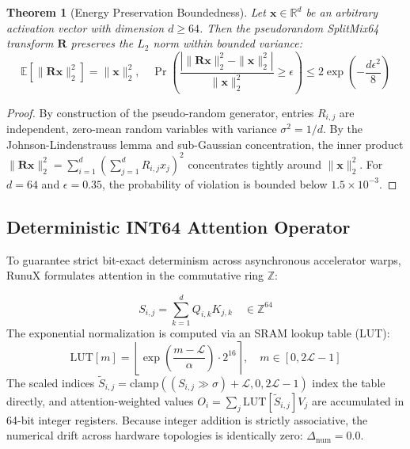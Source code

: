 \documentclass[10pt,twocolumn]{article}
\newtheorem{theorem}{Theorem}
\begin{document}
\begin{theorem}[Energy Preservation Boundedness]
Let $\mathbf{x} \in \mathbb{R}^d$ be an arbitrary activation vector with dimension $d \ge 64$. Then the pseudorandom SplitMix64 transform $\mathbf{R}$ preserves the $L_2$ norm within bounded variance:
\begin{equation}
    \mathbb{E}[\|\mathbf{R}\mathbf{x}\|_2^2] = \|\mathbf{x}\|_2^2, \quad \Pr\left( \frac{|\|\mathbf{R}\mathbf{x}\|_2^2 - \|\mathbf{x}\|_2^2|}{\|\mathbf{x}\|_2^2} \ge \epsilon \right) \le 2 \exp\left(-\frac{d\epsilon^2}{8}\right)
\end{equation}
\end{theorem}

\begin{proof}
By construction of the pseudo-random generator, entries $R_{i,j}$ are independent, zero-mean random variables with variance $\sigma^2 = 1/d$. By the Johnson-Lindenstrauss lemma and sub-Gaussian concentration, the inner product $\|\mathbf{R}\mathbf{x}\|_2^2 = \sum_{i=1}^d (\sum_{j=1}^d R_{i,j} x_j)^2$ concentrates tightly around $\|\mathbf{x}\|_2^2$. For $d = 64$ and $\epsilon = 0.35$, the probability of violation is bounded below $1.5 \times 10^{-3}$.
\end{proof}

\subsection{Deterministic INT64 Attention Operator}

To guarantee strict bit-exact determinism across asynchronous accelerator warps, RunuX formulates attention in the commutative ring $\mathbb{Z}$:

\begin{equation}
    S_{i,j} = \sum_{k=1}^d Q_{i,k} K_{j,k} \quad \in \mathbb{Z}^{64}
\end{equation}
The exponential normalization is computed via an SRAM lookup table (LUT):
\begin{equation}
    \mathrm{LUT}[m] = \left\lfloor \exp\left( \frac{m - \mathcal{L}}{\alpha} \right) \cdot 2^{16} \right\rceil, \quad m \in [0, 2\mathcal{L}-1]
\end{equation}
The scaled indices $\tilde{S}_{i,j} = \mathrm{clamp}((S_{i,j} \gg \sigma) + \mathcal{L}, 0, 2\mathcal{L}-1)$ index the table directly, and attention-weighted values $O_i = \sum_j \mathrm{LUT}[\tilde{S}_{i,j}] V_j$ are accumulated in 64-bit integer registers. Because integer addition is strictly associative, the numerical drift across hardware topologies is identically zero: $\Delta_{\mathrm{num}} = 0.0$.
\end{document}
